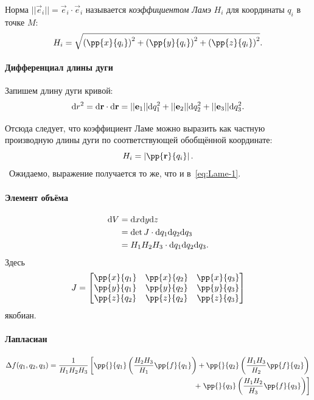 \documentclass[12pt]{report}
\begin{document}
Норма $||\vec e_i|| = \vec e_i\cdot\vec e_i$ называется \emph{коэффициентом Ламэ} $H_i$ для координаты $q_i$ в точке $M$:
\begin{equation}\label{eq:Lame-1}
H_i = \sqrt{\left(\pp{x}{q_i}\right)^2 + \left(\pp{y}{q_i}\right)^2 + \left(\pp{z}{q_i}\right)^2}.
\end{equation}

\paragraph{Дифференциал  длины дуги}
Запишем длину дуги кривой:
\begin{equation*}
	\mathrm d r^2 = \mathrm d\mathbf{r}\cdot\mathrm d\mathbf{r} = ||\mathbf{e}_1||\mathrm d q_1^2 + ||\mathbf{e}_2||\mathrm d q_2^2 + ||\mathbf{e}_3||\mathrm d q_3^2.
\end{equation*}

Отсюда следует, что коэффициент Ламе можно выразить как частную производную длины дуги по соответствующей обобщённой координате:
\begin{equation}\label{eq:Lame-2}
	H_i = \left|\pp{\vec r}{q_i}\right|.
\end{equation}
 Ожидаемо, выражение получается то же, что и в~\eqref{eq:Lame-1}.

\paragraph{Элемент объёма}
\begin{align}
	\mathrm d V &= \mathrm d x\mathrm d y\mathrm d z \notag\\
	&= \det J \cdot \mathrm d q_1\mathrm d q_2\mathrm d q_3 \notag\\
	&= H_1H_2H_3\cdot \mathrm d q_1\mathrm d q_2\mathrm d q_3. \label{eq:unit-volume}
\end{align}
Здесь 
\[
J = \left[\begin{matrix}
\pp{x}{q_1} & \pp{x}{q_2} & \pp{x}{q_3} \\
\pp{y}{q_1} & \pp{y}{q_2} & \pp{y}{q_3} \\
\pp{z}{q_2} & \pp{z}{q_2} & \pp{z}{q_3}
\end{matrix}\right]
\]
якобиан.~\cite{Jacobian}

\paragraph{Лапласиан}
\newcommand{\HHH}[3]{\frac{H_{#1}H_{#2}}{H_{#3}}}
\begin{align}
	\Delta f(q_1,q_2,q_3) = \frac{1}{H_1 H_2 H_3}
	\left[
	      \pp{}{q_1}\left(\HHH{2}{3}{1}\pp{f}{q_1}\right) 
	+ \pp{}{q_2}\left(\HHH{1}{3}{2}\pp{f}{q_2}\right)\right. \notag\\
	+ \left.\pp{}{q_3}\left(\HHH{1}{2}{3}\pp{f}{q_3}\right)
	\right] \label{eq:Laplacian}
\end{align}
\end{document}
